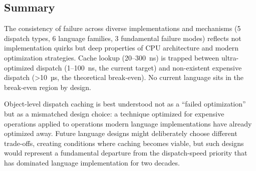 \documentclass[sigplan,final,acmsmall,review,screen]{acmart}
\begin{document}
\subsection{Summary}

The consistency of failure across diverse implementations and mechanisms (5 dispatch types, 6 language families, 3 fundamental failure modes)
reflects not implementation quirks but deep properties of CPU architecture and modern optimization strategies. Cache lookup (20--300~ns) is
trapped between ultra-optimized dispatch (1--100~ns, the current target) and non-existent expensive dispatch (>10~µs, the theoretical break-even).
No current language sits in the break-even region by design.

Object-level dispatch caching is best understood not as a ``failed optimization'' but as a mismatched design choice:
a technique optimized for expensive operations applied to operations modern language implementations have already optimized away.
Future language designs might deliberately choose different trade-offs, creating conditions where caching becomes viable,
but such designs would represent a fundamental departure from the dispatch-speed priority that has dominated language implementation for two decades.


\end{document}
